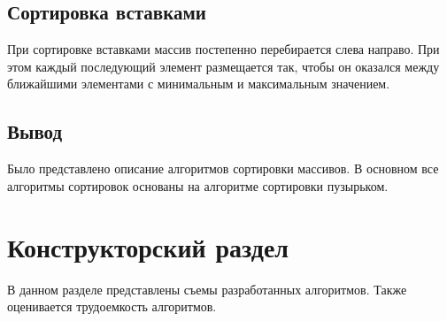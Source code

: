 \documentclass[14pt, a4paper]{extarticle}
\begin{document}
\subsection{Сортировка вставками}
При сортировке вставками массив постепенно перебирается слева направо. При этом каждый последующий элемент размещается так, чтобы он оказался между ближайшими элементами с минимальным и максимальным значением.
\subsection{Вывод}
Было представлено описание алгоритмов сортировки массивов. В основном все алгоритмы сортировок основаны на алгоритме сортировки пузырьком.

\clearpage
\section{Конструкторский раздел}
В данном разделе представлены съемы разработанных алгоритмов. Также оценивается трудоемкость алгоритмов.
\end{document}
